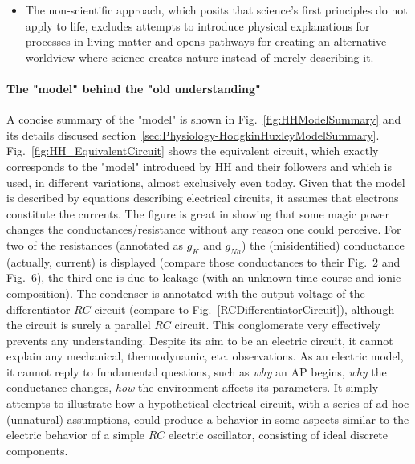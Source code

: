 \begin{itemize}
 they work with ‘ion counting’ but do not attempt to find out the identity of the 'leakage' ions; the leakage ions are neither $K^+$ nor $Na^+$, nor do they generate .
 Theoretically, they assume that the neuron “pumps 3 $Na^+$ ions out of the cell and two potassium ions in”; experimentally, they show in their Fig. 6 that the ratio changes between 0.01 and 7.5
\item The non-scientific approach, which posits that science’s first principles do not apply to life,
excludes attempts to introduce physical explanations for processes in living matter and opens pathways for creating an alternative worldview
where science creates nature instead of merely describing it.
\end{itemize}

\paragraph*{The "model" behind the "old understanding"}
 A concise summary of the "model" is shown in Fig.~\ref{fig:HHModelSummary}
 and its details discused section~\ref{sec:Physiology-HodgkinHuxleyModelSummary}.
Fig.~\ref{fig:HH_EquivalentCircuit} shows the equivalent circuit, which exactly corresponds to the "model" introduced by \gls{HH} 
and their followers and which is used, in different variations, almost exclusively even today. Given that the model is described by equations
describing electrical circuits, it assumes that electrons constitute 
the currents.
The figure is great in showing that some magic power changes
the conductances/resistance without any reason one could perceive.
For two of the resistances (annotated as $g_K$ and $g_{Na}$)
the (misidentified) conductance (actually, current) is displayed
(compare those conductances to their Fig.~2 and Fig.~6),
the third one is due to leakage (with an unknown time course
and ionic composition). 
The condenser is annotated with the output voltage of
the differentiator $RC$ circuit (compare to Fig.~\ref{RCDifferentiatorCircuit}), although the circuit
is surely a parallel $RC$ circuit.
This conglomerate very effectively prevents any understanding.
Despite its aim to be an electric circuit, it cannot explain any mechanical,
thermodynamic, etc. observations. 
As an electric model, it cannot reply to fundamental questions,
such as \textit{why} an \gls{AP} begins, \textit{why} the conductance changes, \textit{how} the environment affects its parameters.
It simply attempts to illustrate how a hypothetical electrical circuit,
with a series of ad hoc (unnatural) assumptions, could produce
a behavior in some aspects similar to the electric behavior
of a simple $RC$ electric oscillator, consisting of ideal discrete components.
                                                                                                      
